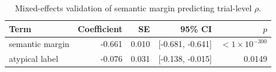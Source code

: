 \begin{table}[htbp]
\centering
\caption{Mixed-effects validation of semantic margin predicting trial-level $\rho$.}
\label{tab:mixed-effects}
\begin{tabular}{lrrrr}
\toprule
Term & Coefficient & SE & 95\% CI & $p$ \\
\midrule
semantic margin & -0.661 & 0.010 & [-0.681, -0.641] & $<1\times10^{-300}$ \\
atypical label & -0.076 & 0.031 & [-0.138, -0.015] & 0.0149 \\
\bottomrule
\end{tabular}
\end{table}

